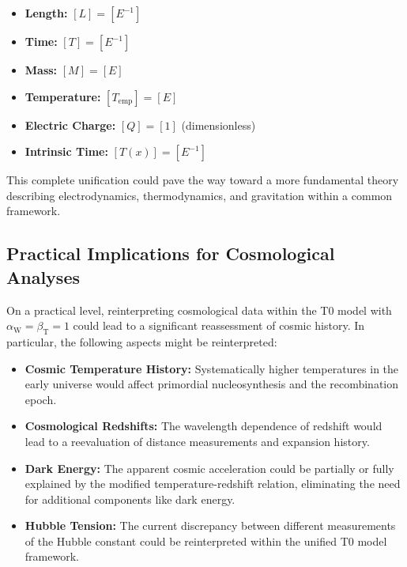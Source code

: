 \documentclass[12pt,a4paper]{article}
\newcommand{\Tfield}{T(x)}
\newcommand{\betaT}{\beta_{\text{T}}}
\newcommand{\alphaW}{\alpha_{\text{W}}}
\begin{document}
	\begin{tcolorbox}[colback=blue!5!white,colframe=blue!75!black,title=Fully Unified Unit System]
		\begin{itemize}
			\item \textbf{Length:} \([L] = [E^{-1}]\)
			\item \textbf{Time:} \([T] = [E^{-1}]\)
			\item \textbf{Mass:} \([M] = [E]\)
			\item \textbf{Temperature:} \([T_{\text{emp}}] = [E]\)
			\item \textbf{Electric Charge:} \([Q] = [1]\) (dimensionless)
			\item \textbf{Intrinsic Time:} \([\Tfield] = [E^{-1}]\)
		\end{itemize}
	\end{tcolorbox}
	
	This complete unification could pave the way toward a more fundamental theory describing electrodynamics, thermodynamics, and gravitation within a common framework.
	
	\subsection{Practical Implications for Cosmological Analyses}
	
	On a practical level, reinterpreting cosmological data within the T0 model with \(\alphaW = \betaT = 1\) could lead to a significant reassessment of cosmic history. In particular, the following aspects might be reinterpreted:
	
	\begin{itemize}
		\item \textbf{Cosmic Temperature History:} Systematically higher temperatures in the early universe would affect primordial nucleosynthesis and the recombination epoch.
		\item \textbf{Cosmological Redshifts:} The wavelength dependence of redshift would lead to a reevaluation of distance measurements and expansion history.
		\item \textbf{Dark Energy:} The apparent cosmic acceleration could be partially or fully explained by the modified temperature-redshift relation, eliminating the need for additional components like dark energy.
		\item \textbf{Hubble Tension:} The current discrepancy between different measurements of the Hubble constant could be reinterpreted within the unified T0 model framework.
	\end{itemize}
	
\end{document}
